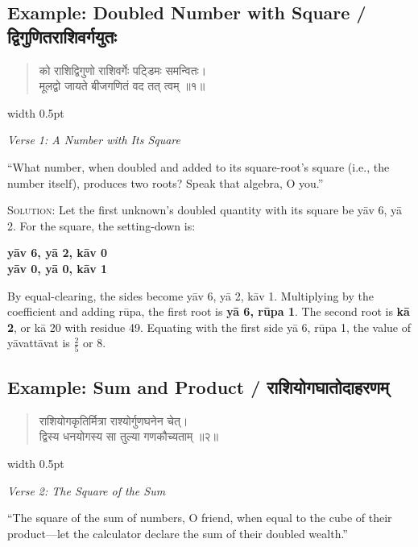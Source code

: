 \documentclass[11pt,a4paper]{article}
\newcommand{\vs}{\vspace{0.5em}}
\newenvironment{sanskritverse}{%
  \begin{quote}\devanagarifont\textcolor{versecolor}%
}{%
  \end{quote}
}
\newcommand{\bilingual}[2]{%
  \par\vspace{0.5em}%
  \noindent\begin{minipage}[t]{0.47\textwidth}%
  \setlength{\parindent}{0pt}%
  \small #1%
  \end{minipage}%
  \hfill\textcolor{columnrule}{\vrule width 0.5pt}\hfill%
  \begin{minipage}[t]{0.47\textwidth}%
  \setlength{\parindent}{0pt}%
  \small\raggedright #2%
  \end{minipage}%
  \par\vspace{0.5em}%
}
\begin{document}
{\newpage

\subsection*{Example: Doubled Number with Square / द्विगुणितराशिवर्गयुतः}

\bilingual{\begin{sanskritverse}
को राशिद्विगुणो राशिवर्गेः पट्डिमः समन्वितः।\\
मूलद्वो जायते बीजगणितं वद तत् त्वम् ॥१॥
\end{sanskritverse}
}{%
\begin{flushright}
\textit{Verse 1: A Number with Its Square}
\end{flushright}
``What number, when doubled and added to its square-root's square (i.e., the number itself), produces two roots? Speak that algebra, O you.''

\vs
\textsc{Solution:} Let the first unknown's doubled quantity with its square be y\={a}v 6, y\={a} 2. For the square, the setting-down is:
\begin{center}\textbf{y\={a}v 6, y\={a} 2, k\={a}v 0}\\\textbf{y\={a}v 0, y\={a} 0, k\={a}v 1}\end{center}
By equal-clearing, the sides become y\={a}v 6, y\={a} 2, k\={a}v 1. Multiplying by the coefficient and adding r\={u}pa, the first root is \textbf{y\={a} 6, r\={u}pa 1}. The second root is \textbf{k\={a} 2}, or k\={a} 20 with residue 49. Equating with the first side y\={a} 6, r\={u}pa 1, the value of y\={a}vatt\={a}vat is $\frac{2}{5}$ or 8.}

\newpage

\subsection*{Example: Sum and Product / राशियोगघातोदाहरणम्}

\bilingual{\begin{sanskritverse}
राशियोगकृतिर्मित्रा राश्योर्गुणघनेन चेत्।\\
द्विस्य धनयोगस्य सा तुल्या गणकौच्यताम् ॥२॥
\end{sanskritverse}
}{%
\begin{flushright}
\textit{Verse 2: The Square of the Sum}
\end{flushright}
``The square of the sum of numbers, O friend, when equal to the cube of their product---let the calculator declare the sum of their doubled wealth.''

}}
\end{document}
